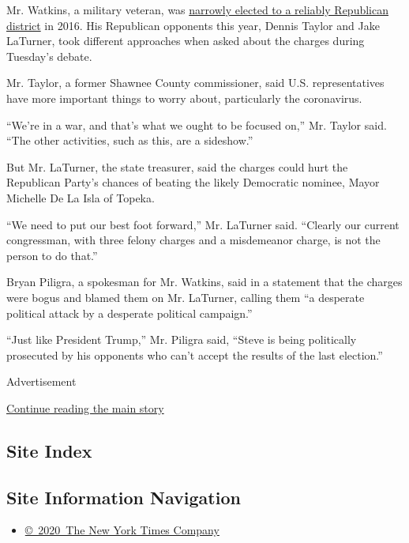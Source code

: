Mr. Watkins, a military veteran, was
\href{https://www.nytimes.com/elections/results/kansas-house-district-2}{narrowly
elected to a reliably Republican district} in 2016. His Republican
opponents this year, Dennis Taylor and Jake LaTurner, took different
approaches when asked about the charges during Tuesday's debate.

Mr. Taylor, a former Shawnee County commissioner, said U.S.
representatives have more important things to worry about, particularly
the coronavirus.

``We're in a war, and that's what we ought to be focused on,'' Mr.
Taylor said. ``The other activities, such as this, are a sideshow.''

But Mr. LaTurner, the state treasurer, said the charges could hurt the
Republican Party's chances of beating the likely Democratic nominee,
Mayor Michelle De La Isla of Topeka.

``We need to put our best foot forward,'' Mr. LaTurner said. ``Clearly
our current congressman, with three felony charges and a misdemeanor
charge, is not the person to do that.''

Bryan Piligra, a spokesman for Mr. Watkins, said in a statement that the
charges were bogus and blamed them on Mr. LaTurner, calling them ``a
desperate political attack by a desperate political campaign.''

``Just like President Trump,'' Mr. Piligra said, ``Steve is being
politically prosecuted by his opponents who can't accept the results of
the last election.''

Advertisement

\protect\hyperlink{after-bottom}{Continue reading the main story}

\hypertarget{site-index}{%
\subsection{Site Index}\label{site-index}}

\hypertarget{site-information-navigation}{%
\subsection{Site Information
Navigation}\label{site-information-navigation}}

\begin{itemize}
\tightlist
\item
  \href{https://help.nytimes.com/hc/en-us/articles/115014792127-Copyright-notice}{©~2020~The
  New York Times Company}
\end{itemize}

